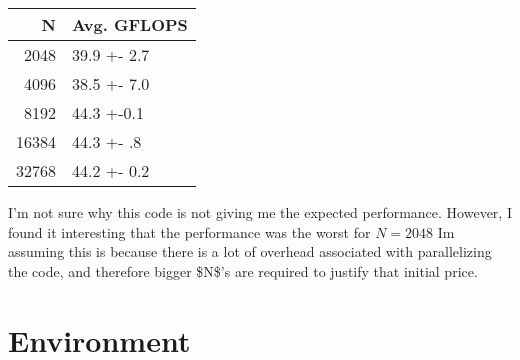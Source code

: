\documentclass[11pt]{article}
\begin{document}
\begin{center}
\begin{tabular}{rl}
N & Avg. GFLOPS\\
\hline
2048 & 39.9 +- 2.7\\
4096 & 38.5 +- 7.0\\
8192 & 44.3 +-0.1\\
16384 & 44.3 +- .8\\
32768 & 44.2 +- 0.2\\
\end{tabular}
\end{center}


I'm not sure why this code is not giving me the expected performance. However, I found it interesting that the performance was the worst for \(N = 2048\) Im assuming this is because there is a lot of overhead associated with parallelizing the code, and therefore bigger \$N\$'s are required to justify that initial price.
\section{Environment}
\label{sec:org1f77f98}
\end{document}
